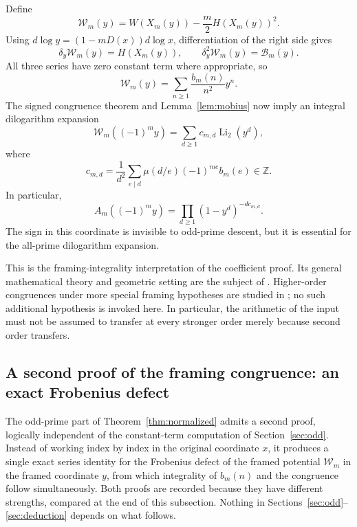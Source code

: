 \documentclass[11pt,letterpaper]{article}
\numberwithin{equation}{section}
\theoremstyle{definition}
\newcommand{\Z}{\mathbb Z}
\newcommand{\dd}{\delta}
\newcommand{\Li}{\operatorname{Li}}
\newcommand{\Bn}{\mathcal B}
\newcommand{\Wm}{\mathcal W}
\begin{document}
Define
\begin{equation}\label{eq:framed-potential}
\Wm_m(y)=W(X_m(y))-\frac m2 H(X_m(y))^2.
\end{equation}
Using $d\log y=(1-mD(x))d\log x$, differentiation of the right side
gives
\[
\dd_y\Wm_m(y)=H(X_m(y)),\qquad
\dd_y^2\Wm_m(y)=\Bn_m(y).
\]
All three series have zero constant term where appropriate, so
\begin{equation}\label{eq:potential-coeff}
\Wm_m(y)=\sum_{n\geq1}\frac{b_m(n)}{n^2}y^n.
\end{equation}
The signed congruence theorem and Lemma~\ref{lem:mobius} now imply an
integral dilogarithm expansion
\begin{equation}\label{eq:framed-dilog}
\Wm_m((-1)^m y)=\sum_{d\geq1}c_{m,d}\Li_2(y^d),
\end{equation}
where
\begin{equation}\label{eq:framed-c}
c_{m,d}=\frac1{d^2}\sum_{e\mid d}\mu(d/e)(-1)^{me}b_m(e)\in\Z.
\end{equation}
In particular,
\begin{equation}\label{eq:framed-Euler}
A_m((-1)^m y)=\prod_{d\geq1}(1-y^d)^{-d c_{m,d}}.
\end{equation}
The sign in this coordinate is invisible to odd-prime descent, but it
is essential for the all-prime dilogarithm expansion.

This is the framing-integrality interpretation of the coefficient
proof. Its general mathematical theory and geometric setting are the
subject of \cite{svw2013,svw2017}. Higher-order congruences under more
special framing hypotheses are studied in \cite{mueller}; no such
additional hypothesis is invoked here. In particular, the arithmetic of
the input must not be assumed to transfer at every stronger order merely
because second order transfers.

\subsection{A second proof of the framing congruence: an exact Frobenius
defect}\label{sec:defect-route}

The odd-prime part of Theorem~\ref{thm:normalized} admits a second proof,
logically independent of the constant-term computation of
Section~\ref{sec:odd}. Instead of working index by index in the original
coordinate $x$, it produces a single exact series identity for the
Frobenius defect of the framed potential $\Wm_m$ in the framed coordinate
$y$, from which integrality of $b_m(n)$ and the congruence follow
simultaneously. Both proofs are recorded because they have different
strengths, compared at the end of this subsection. Nothing in
Sections~\ref{sec:odd}--\ref{sec:deduction} depends on what follows.
\end{document}
